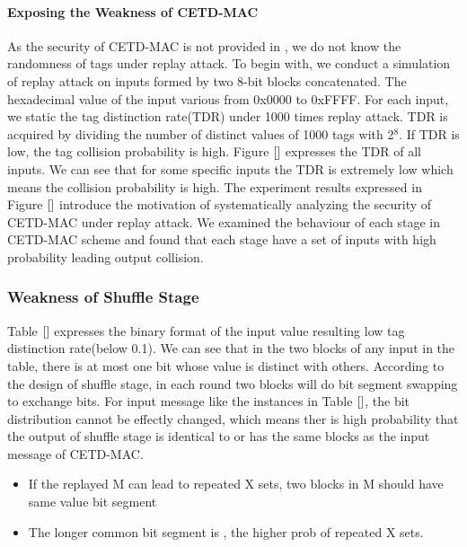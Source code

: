 \documentclass{article}
\begin{document}
\paragraph{Exposing the Weakness of CETD-MAC}
As the security of CETD-MAC is not provided in \cite{}, we do not know the randomness of tags under replay attack. To begin with, we conduct a simulation of replay attack on inputs formed by two 8-bit blocks concatenated. The hexadecimal value of the input various from 0x0000 to 0xFFFF. For each input, we static the tag distinction rate(TDR) under 1000 times replay attack. TDR is acquired by dividing the number of distinct values of 1000 tags with 2$^8$. If TDR is low, the tag collision probability is high. Figure $\ref{}$ expresses the TDR of all inputs. We can see that for some specific inputs the TDR is extremely low which means the collision probability is high. The experiment results expressed in Figure $\ref{}$ introduce the motivation of systematically analyzing the security of CETD-MAC under replay attack. We examined the behaviour of each stage in CETD-MAC scheme and found that each stage have a set of inputs with high probability leading output collision.

\subsubsection{Weakness of Shuffle Stage}
Table $\ref{}$ expresses the binary format of the input value resulting low tag distinction rate(below 0.1). We can see that in the two blocks of any input in the table, there is at most one bit whose value is distinct with others. According to the design of shuffle stage, in each round two blocks will do bit segment swapping to exchange bits. For input message like the instances in Table $\ref{}$, the bit distribution cannot be effectly changed, which means ther is high probability that the output of shuffle stage is identical to or has the same blocks as the input message of CETD-MAC. 

\begin{itemize}
	\item If the replayed M can lead to repeated X sets, two blocks in M should have same value bit segment
	\item The longer common bit segment is , the higher prob of repeated X sets.
\end{itemize}
\end{document}
